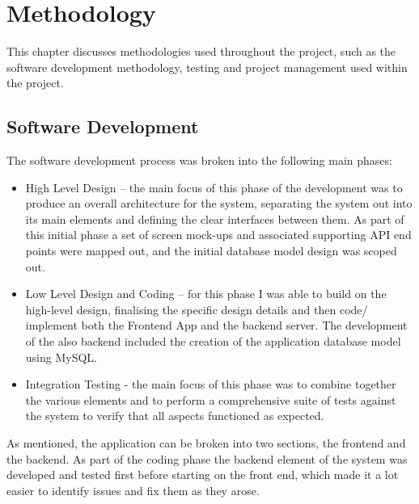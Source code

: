 \chapter{Methodology}
This chapter discusses methodologies used throughout the project, such as the software development methodology, testing and project management used within the project.
\newline 

\section{Software Development}
The software development process was broken into the following main phases:
\begin{itemize}
    \item High Level Design – the main focus of this phase of the development was to produce an overall architecture for the system, separating the system out into its main elements and defining the clear interfaces between them. As part of this initial phase a set of screen mock-ups and associated supporting API end points were mapped out, and the initial database model design was scoped out.
    \item Low Level Design and Coding – for this phase I was able to build on the high-level design, finalising the specific design details and then code/ implement both the Frontend App and the backend server. The development of the also backend included the creation of the application database model using MySQL.
    \item Integration Testing - the main focus of this phase was to combine together the various elements and to perform a comprehensive suite of tests against the system to verify that all aspects functioned as expected.
\end{itemize}
As mentioned, the application can be broken into two sections, the frontend and the backend. As part of the coding phase the backend element of the system was developed and tested first before starting on the front end, which made it a lot easier to identify issues and fix them as they arose. 

